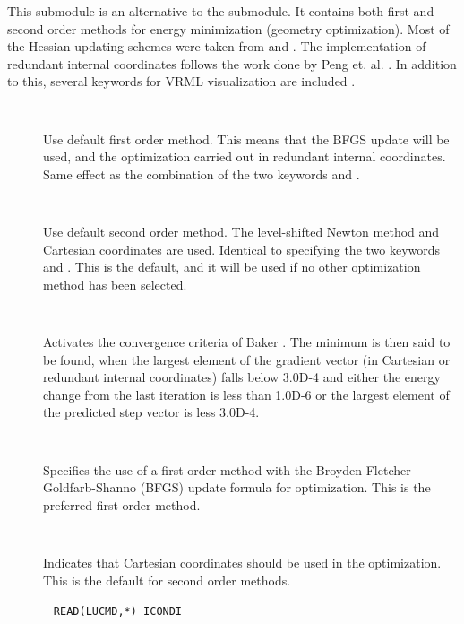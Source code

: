 This submodule is an alternative to the  submodule. It
contains both first and second order methods for energy 
minimization (geometry optimization). Most of the Hessian updating
schemes were taken from \cite{MEST} and \cite{Fletcher}. The
implementation of redundant internal coordinates follows the work done
by Peng et. al. \cite{Peng}. In addition to this, several
keywords for VRML visualization are included \cite{VRML}.

\begin{description}

\item[]\verb| |

Use default first order method. This means that the BFGS update will
be used, and the optimization carried out in redundant internal
coordinates. Same effect as the combination of the two keywords
 and .

\item[]\verb| |

Use default second order method. The level-shifted Newton method and
Cartesian coordinates are used. Identical to specifying the two
keywords  and . This is the default, and it
will be used if no other optimization method has been selected.

\item[]\verb| |

Activates the convergence criteria of Baker \cite{Baker}. The minimum is then said
to be found, when the largest element of the gradient vector (in
Cartesian or redundant internal coordinates) falls below 3.0D-4 and
either the energy change from the last iteration is less than 1.0D-6
or the largest element of the predicted step vector is less 3.0D-4.

\item[]\verb| |

Specifies the use of a first order method with the
Broyden-Fletcher-Goldfarb-Shanno (BFGS) update formula for
optimization. This is the preferred first order method.

\item[]\verb| |

Indicates that Cartesian coordinates should be used in the
optimization. This is the default for second order methods.

\item[]\verb| |
\newline
\verb|READ(LUCMD,*) ICONDI|


\end{description}
